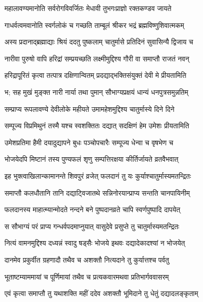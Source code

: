 \twolineshloka
{महालावण्यमानोति सर्वरोगविवर्जितः}
{मेधावी तुभगःप्राज्ञो रक्तकण्डव जायते} %

\twolineshloka
{गाधर्वत्वमवानोति स्वर्गलोकं च गच्छति}
{ताम्बूलं श्रीकर भद्रं ब्रह्मविष्णुशिवात्मकम्} %

\twolineshloka
{अस्य प्रदानाद्ब्रह्माद्याः श्रियं ददतु पुष्कलाम्}
{चातुर्मासे प्रतिदिनं सुवासिन्यै द्विजाय च} %

\twolineshloka
{नारीवा पुरुषो वापि हरिद्रां सम्प्रयच्छति}
{लक्ष्मीमुद्दिश्य गौरी वा समाप्तौ राजतं नवन्} %

\twolineshloka
{हरिद्रापूरितं कृत्वा तत्पात्र दक्षिणान्वितम्}
{प्रदद्याद्भक्तिसंयुक्तं देवी मे प्रीयतामिति} %

\twolineshloka
{भ; सह मुखं मुङ्क्त नारी नार्या तथा पुमान्}
{सौभाग्यप्रक्षयं धान्यं धनपुत्रसमुन्नतिम्} %

\twolineshloka
{सम्प्राप्य रूपलावण्ये देवीलोके महीयते}
{उमामहेशमुद्दिश्य चातुर्मास्ये दिने दिने} %

\twolineshloka
{सम्पूज्य विप्रमिथुनं तस्मै यश्च स्वशक्तितः}
{दद्यात् सदक्षिणं हेम उमेशः प्रीयतामिति} %

\twolineshloka
{उमेशप्रतिमा हैमी दयादुद्यापने बुधः}
{पञ्चोपचारैः सम्पूज्य धेन्वा च वृषभेण च} %

\twolineshloka
{भोजयेदपि मिष्टानं तस्य पुण्यफलं शृणु}
{सम्पत्तिरक्षया कीर्तिर्जायते व्रतवैभवात्} %

\twolineshloka
{इह भुक्त्वाखिलान्कामानन्ते शिवपुरं व्रजेत्}
{फलदानं तु यः कुर्याश्चातुर्मास्यमतन्द्रितः} %

\twolineshloka
{समाप्तौ कलधौतानि तानि दद्याट्विजातथे}
{सन्निनोरयान्प्राप्य सन्तति चानपायिनीम्} %

\twolineshloka
{फलदानस्य माहात्म्यान्मोदते नन्दने बने}
{पुष्पदानव्रते चापि स्वर्णपुष्पादि दापयेत्} %

\twolineshloka
{स सौभाग्यं परं प्राप्य गन्धर्वपदमाप्नुयात्}
{वासुदेवे प्रसुप्ते तु चातुर्मास्यमतन्द्रितः} %

\twolineshloka
{नित्यं वामनमुद्दिश्य दध्यन्नं स्वादु षड्सैः}
{भोजये इथवः दद्यादेकादश्यां न भोजयेत्} %

\twolineshloka
{दानमेव प्रकुर्वीत ग्रहणादौ तथैव च}
{अशक्तौ नित्यदाने तु कुर्यात्तश्च पर्वतु} %

\twolineshloka
{भूताष्टम्याममायां च पूर्णिमायां तथैव च}
{प्रत्यकवारमथवा प्रतिभार्गववासरम्} %

\twolineshloka
{एवं कृत्वा समाप्तौ तु यथाशक्ति महीं ददेव}
{अशक्तौ भूमिदाने तु धेतुं दद्यादलङ्कृताम्} %

